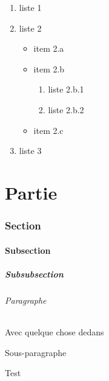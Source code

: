 \documentclass{article}
\begin{document}
			\begin{enumerate}
				\item liste 1
				\item liste 2
					\begin{itemize}[label=$\bullet$]
						\item item 2.a
						\item item 2.b
							\begin{enumerate}
								\item liste 2.b.1
								\item liste 2.b.2
							\end{enumerate}
						\item item 2.c
					\end{itemize}
				\item liste 3
			\end{enumerate}

			

	\part{Partie}

		\section{Section}

			\subsection{Subsection}

				\subsubsection{Subsubsection}

					\paragraph{Paragraphe}%
						Avec quelque chose dedans

						\subparagraph{Sous-paragraphe}%
							Test
\end{document}
